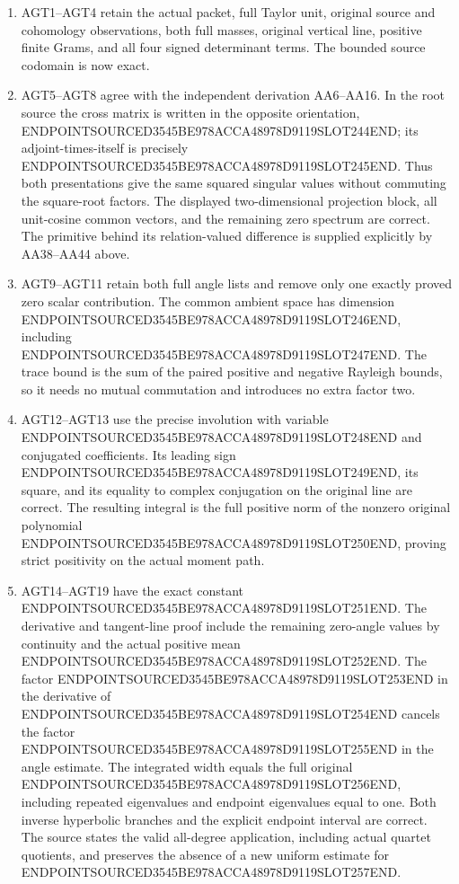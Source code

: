\begin{enumerate}
\def\labelenumi{\arabic{enumi}.}
\tightlist
\item
  AGT1--AGT4 retain the actual packet, full Taylor unit, original source and cohomology observations, both full masses, original vertical line, positive finite Grams, and all four signed determinant terms. The bounded source codomain is now exact.
\item
  AGT5--AGT8 agree with the independent derivation AA6--AA16. In the root source the cross matrix is written in the opposite orientation, ENDPOINTSOURCED3545BE978ACCA48978D9119SLOT244END; its adjoint-times-itself is precisely ENDPOINTSOURCED3545BE978ACCA48978D9119SLOT245END. Thus both presentations give the same squared singular values without commuting the square-root factors. The displayed two-dimensional projection block, all unit-cosine common vectors, and the remaining zero spectrum are correct. The primitive behind its relation-valued difference is supplied explicitly by AA38--AA44 above.
\item
  AGT9--AGT11 retain both full angle lists and remove only one exactly proved zero scalar contribution. The common ambient space has dimension ENDPOINTSOURCED3545BE978ACCA48978D9119SLOT246END, including ENDPOINTSOURCED3545BE978ACCA48978D9119SLOT247END. The trace bound is the sum of the paired positive and negative Rayleigh bounds, so it needs no mutual commutation and introduces no extra factor two.
\item
  AGT12--AGT13 use the precise involution with variable ENDPOINTSOURCED3545BE978ACCA48978D9119SLOT248END and conjugated coefficients. Its leading sign ENDPOINTSOURCED3545BE978ACCA48978D9119SLOT249END, its square, and its equality to complex conjugation on the original line are correct. The resulting integral is the full positive norm of the nonzero original polynomial ENDPOINTSOURCED3545BE978ACCA48978D9119SLOT250END, proving strict positivity on the actual moment path.
\item
  AGT14--AGT19 have the exact constant ENDPOINTSOURCED3545BE978ACCA48978D9119SLOT251END. The derivative and tangent-line proof include the remaining zero-angle values by continuity and the actual positive mean ENDPOINTSOURCED3545BE978ACCA48978D9119SLOT252END. The factor ENDPOINTSOURCED3545BE978ACCA48978D9119SLOT253END in the derivative of ENDPOINTSOURCED3545BE978ACCA48978D9119SLOT254END cancels the factor ENDPOINTSOURCED3545BE978ACCA48978D9119SLOT255END in the angle estimate. The integrated width equals the full original ENDPOINTSOURCED3545BE978ACCA48978D9119SLOT256END, including repeated eigenvalues and endpoint eigenvalues equal to one. Both inverse hyperbolic branches and the explicit endpoint interval are correct. The source states the valid all-degree application, including actual quartet quotients, and preserves the absence of a new uniform estimate for ENDPOINTSOURCED3545BE978ACCA48978D9119SLOT257END.
\end{enumerate}

